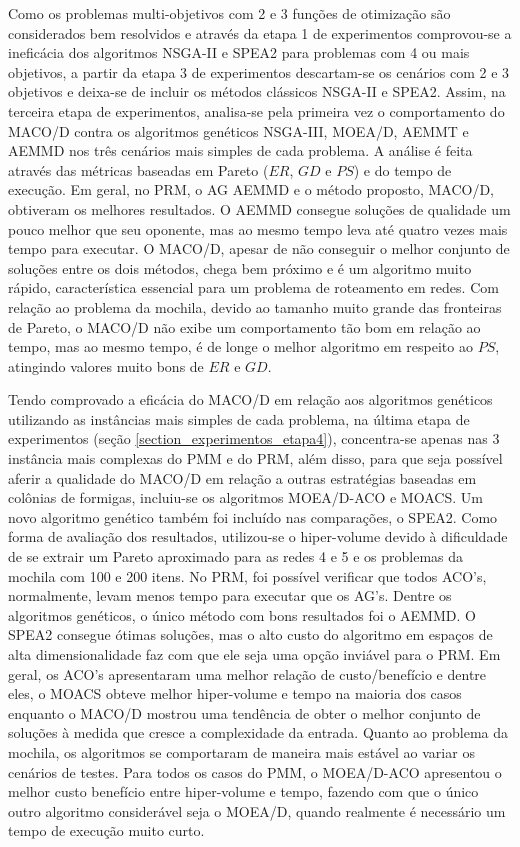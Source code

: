Como os problemas multi-objetivos com 2 e 3 funções de otimização são considerados bem resolvidos e através da etapa 1 de experimentos comprovou-se a ineficácia dos algoritmos NSGA-II e SPEA2 para problemas com 4 ou mais objetivos, a partir da etapa 3 de experimentos descartam-se os cenários com 2 e 3 objetivos e deixa-se de incluir os métodos clássicos NSGA-II e SPEA2. Assim, na terceira etapa de experimentos, analisa-se pela primeira vez o comportamento do MACO/D contra os algoritmos genéticos NSGA-III, MOEA/D, AEMMT e AEMMD nos três cenários mais simples de cada problema. A análise é feita através das métricas baseadas em Pareto ($ER$, $GD$ e $PS$) e do tempo de execução. Em geral, no PRM, o AG AEMMD e o método proposto, MACO/D, obtiveram os melhores resultados. O AEMMD consegue soluções de qualidade um pouco melhor que seu oponente, mas ao mesmo tempo leva até quatro vezes mais tempo para executar. O MACO/D, apesar de não conseguir o melhor conjunto de soluções entre os dois métodos, chega bem próximo e é um algoritmo muito rápido, característica essencial para um problema de roteamento em redes. Com relação ao problema da mochila, devido ao tamanho muito grande das fronteiras de Pareto, o MACO/D não exibe um comportamento tão bom em relação ao tempo, mas ao mesmo tempo, é de longe o melhor algoritmo em respeito ao $PS$, atingindo valores muito bons de $ER$ e $GD$.

Tendo comprovado a eficácia do MACO/D em relação aos algoritmos genéticos utilizando as instâncias mais simples de cada problema, na última etapa de experimentos (seção \ref{section_experimentos_etapa4}), concentra-se apenas nas 3 instância mais complexas do PMM e do PRM, além disso, para que seja possível aferir a qualidade do MACO/D em relação a outras estratégias baseadas em colônias de formigas, incluiu-se os algoritmos MOEA/D-ACO e MOACS. Um novo algoritmo genético também foi incluído nas comparações, o SPEA2. Como forma de avaliação dos resultados, utilizou-se o hiper-volume devido à dificuldade de se extrair um Pareto aproximado para as redes 4 e 5 e os problemas da mochila com 100 e 200 itens. No PRM, foi possível verificar que todos ACO's, normalmente, levam menos tempo para executar que os AG's. Dentre os algoritmos genéticos, o único método com bons resultados foi o AEMMD. O SPEA2 consegue ótimas soluções, mas o alto custo do algoritmo em espaços de alta dimensionalidade faz com que ele seja uma opção inviável para o PRM. Em geral, os ACO's apresentaram uma melhor relação de custo/benefício e dentre eles, o MOACS obteve melhor hiper-volume e tempo na maioria dos casos enquanto o MACO/D mostrou uma tendência de obter o melhor conjunto de soluções à medida que cresce a complexidade da entrada. Quanto ao problema da mochila, os algoritmos se comportaram de maneira mais estável ao variar os cenários de testes. Para todos os casos do PMM, o MOEA/D-ACO apresentou o melhor custo benefício entre hiper-volume e tempo, fazendo com que o único outro algoritmo considerável seja o MOEA/D, quando realmente é necessário um tempo de execução muito curto.

